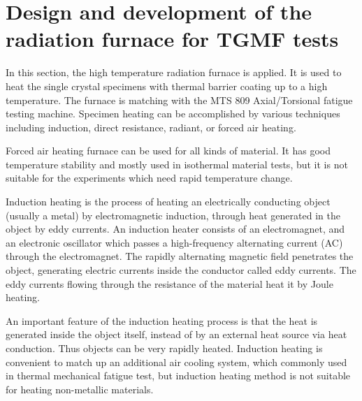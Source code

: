 \section{Design and development of the radiation furnace for TGMF tests}
In this section, the high temperature radiation furnace is applied.
It is used to heat the single crystal specimens with thermal barrier coating up to a high temperature.
The furnace is matching with the MTS 809 Axial/Torsional fatigue testing machine.
Specimen heating can be accomplished by various techniques including induction, direct resistance, radiant, or forced air heating.




Forced air heating furnace can be used for all kinds of material. It has good temperature stability and mostly used in isothermal material tests, but it is not suitable for the experiments which need rapid temperature change.

Induction heating is the process of heating an electrically conducting object (usually a metal) by electromagnetic induction, through heat generated in the object by eddy currents. An induction heater consists of an electromagnet, and an electronic oscillator which passes a high-frequency alternating current (AC) through the electromagnet. The rapidly alternating magnetic field penetrates the object, generating electric currents inside the conductor called eddy currents. The eddy currents flowing through the resistance of the material heat it by Joule heating.

An important feature of the induction heating process is that the heat is generated inside the object itself, instead of by an external heat source via heat conduction. Thus objects can be very rapidly heated.
Induction heating is convenient to match up an additional air cooling system, which commonly used in thermal mechanical fatigue test, but induction heating method is not suitable for heating non-metallic materials.




